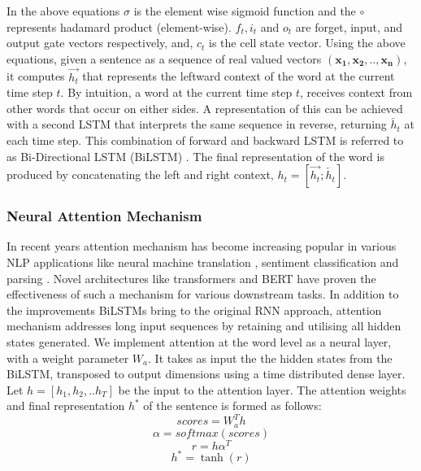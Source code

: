 In the above equations $\sigma$ is the element wise sigmoid function and the $\circ$ represents hadamard product (element-wise). $f_t, i_t$ and $o_t$ are forget, input, and output gate vectors respectively, and, $c_t$ is the cell state vector. Using the above equations, given a sentence as a sequence of real valued vectors $\boldsymbol{(x_1, x_2, .., x_n)}$, it computes $\overrightarrow{h_{t}}$ that represents the leftward context of the word at the current time step $t$. By intuition, a word at the current time step $t$, receives context from other words that occur on either sides. A representation of this can be achieved with a second LSTM that interprets the same sequence in reverse, returning $\overleftarrow{h_{t}}$ at each time step. This combination of forward and backward LSTM is referred to as Bi-Directional LSTM (BiLSTM) \cite{graves2005framewise}. The final representation of the word is produced by concatenating the left and right context, $h_{t}=[\overrightarrow{h_{t}};\overleftarrow{h_{t}}]$.


\subsubsection{\textbf{Neural Attention Mechanism}}
In recent years attention mechanism has become increasing popular in various NLP applications like neural machine translation \cite{bahdanau2014neural}, sentiment classification \cite{chen2017recurrent} and parsing \cite{li2016discourse}. Novel architectures like transformers \cite{vaswani2017attention} and BERT \cite{devlin2018bert} have proven the effectiveness of such a mechanism for various downstream tasks. In addition to the improvements BiLSTMs bring to the original RNN approach, attention mechanism addresses long input sequences by retaining and utilising all hidden states generated. We implement attention at the word level as a neural layer, with a weight parameter $W_{a}$. It takes as input the the hidden states from the BiLSTM, transposed to output dimensions using a time distributed dense layer. Let $h = [h_1, h_2, .. h_{T}]$ be the input to the attention layer. The attention weights and final representation $h^*$ of the sentence is formed as follows:
\begin{equation}
    scores = W_a^Th
\end{equation}
\begin{equation}\label{attention-score}
    \alpha = softmax(scores)      
\end{equation}
\begin{equation}
    r = h\alpha^T    
\end{equation}
\begin{equation}\label{attention-repr}
    h^* = \tanh(r)    
\end{equation}

